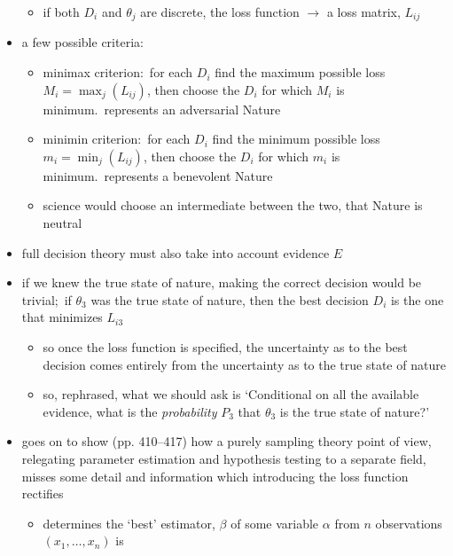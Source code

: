 \documentclass[../jaynes_prob_theory_notes.tex]{subfiles}
\begin{document}
\begin{itemize}
                    \begin{itemize} 
                        \item if both \(D_i\) and \(\theta_j\) are discrete, the loss function \(\rightarrow\) a loss matrix, \(L_{ij}\)
                    \end{itemize}
                \item a few possible criteria:
                    \begin{itemize}
                        \item minimax criterion:\ for each \(D_i\) find the maximum possible loss \(M_i = \max_j (L_{ij})\), then choose the \(D_i\) for which \(M_i\) is minimum.\ represents an adversarial Nature
                        \item minimin criterion:\ for each \(D_i\) find the minimum possible loss \(m_i = \min_j (L_{ij})\), then choose the \(D_i\) for which \(m_i\) is minimum.\ represents a benevolent Nature
                        \item science would choose an intermediate between the two, that Nature is neutral
                    \end{itemize}
                \item full decision theory must also take into account evidence \(E\)
                \item if we knew the true state of nature, making the correct decision would be trivial;\ if \(\theta_3\) was the true state of nature, then the best decision \(D_i\) is the one that minimizes \(L_{i3}\)
                    \begin{itemize} 
                        \item so once the loss function is specified, the uncertainty as to the best decision comes entirely from the uncertainty as to the true state of nature
                        \item so, rephrased, what we should ask is `Conditional on all the available evidence, what is the \textit{probability} \(P_3\) that \(\theta_3\) is the true state of nature?'
                    \end{itemize}
                \item goes on to show (pp. 410--417) how a purely sampling theory point of view, relegating parameter estimation and hypothesis testing to a separate field, misses some detail and information which introducing the loss function rectifies
                    \begin{itemize} 
                        \item determines the `best' estimator, \(\beta\) of some variable \(\alpha\) from \(n\) observations \((x_1, \ldots, x_n)\) is

\end{itemize}
\end{itemize}
\end{document}
